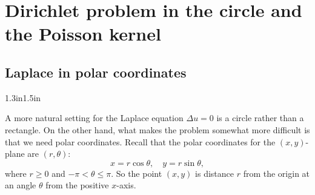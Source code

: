 %


\sectionnewpage
\section{Dirichlet problem in the circle and the Poisson kernel}
\label{dirichdisc:section}



\subsection{Laplace in polar coordinates}

\begin{mywrapfigsimp}[5]{1.3in}{1.5in}
\diffypdfversion{\vspace*{5pt}}
\noindent
{}
\diffypdfversion{\vspace*{5pt}}
\end{mywrapfigsimp}
A more natural setting for the Laplace equation $\Delta u = 0$
is a circle rather than a rectangle.  On the other hand, what makes the
problem somewhat more difficult is that we need polar coordinates.
Recall that the polar coordinates for the $(x,y)$-plane are $(r,\theta)$: 
\begin{equation*}
x = r \cos \theta , \quad y = r \sin \theta ,
\end{equation*}
where $r \geq 0$ and $-\pi < \theta \leq \pi$.  So the point $(x,y)$ is
distance $r$ from the origin at an angle $\theta$ from the positive
$x$-axis.

